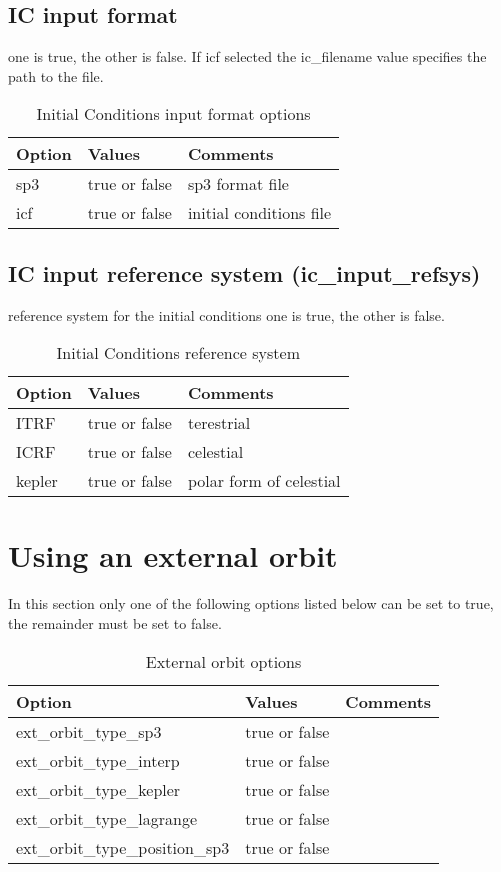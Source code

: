 \subsection{IC input format}
 one is true, the other is false. If icf selected the ic\_filename value specifies the path to the file.
\begin{table}[h!]
\begin{tabular}{|p{2.5cm}|p{2.5cm}|p{5cm}|}
	\hline
	Option & Values & Comments \\
	\hline
   sp3 & true or false & sp3 format file\\
   icf & true or false & initial conditions file\\
   \hline
\end{tabular}
\caption{Initial Conditions input format options}
\label{table:yaml}
\end{table}
%
\subsection{IC input reference system (ic\_input\_refsys)}
reference system for the initial conditions one is true, the other is false. 
\begin{table}[h!]
	\begin{tabular}{|p{2.5cm}|p{2.5cm}|p{5cm}|}
		\hline
		Option & Values & Comments \\
		\hline
		ITRF & true or false & terestrial\\
		ICRF & true or false & celestial \\
		kepler & true or false & polar form of celestial\\
		\hline
	\end{tabular}
	\caption{Initial Conditions reference system}
	\label{table:yaml}
\end{table}


%
\section{Using an external orbit}
In this section only one of the following options listed below can be set to true, the remainder must be set to false.\\
\begin{table}[h!]
\begin{tabular}{|p{4.5cm}|p{2cm}|p{3.5cm}|}
	\hline
	Option & Values & Comments \\
	\hline
	ext\_orbit\_type\_sp3  & true or false & \\
	ext\_orbit\_type\_interp & true or false & \\
	ext\_orbit\_type\_kepler & true or false & \\
	ext\_orbit\_type\_lagrange & true or false & \\
	ext\_orbit\_type\_position\_sp3 & true or false & \\
    \hline
\end{tabular}
	\caption{External orbit options}
\label{table:yaml}
\end{table}
%
